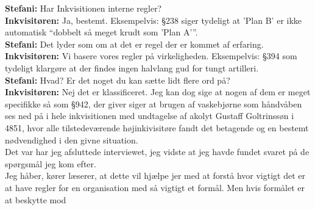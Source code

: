 \documentclass[letterpaper,12pt]{memoir}
\begin{document}
\textbf{Stefani:} Har Inkvisitionen interne regler?\\
\textbf{Inkvisitøren:} Ja, bestemt. Eksempelvis: §238 siger tydeligt at 'Plan B' er ikke automatisk “dobbelt så meget krudt som 'Plan A'”.\\

\textbf{Stefani:} Det lyder som om at det er regel der er kommet af erfaring.\\
\textbf{Inkvisitøren:} Vi basere vores regler på virkeligheden. Eksempelvis: §394 som tydeligt klargøre at der findes ingen halvlang gud for tungt artilleri.\\

\textbf{Stefani:} Hvad? Er det noget du kan sætte lidt flere ord på?\\
\textbf{Inkvisitøren:} Nej det er klassificeret. Jeg kan dog sige at nogen af dem er meget specifikke så som §942, der giver siger at brugen af vaskebjørne som håndvåben ses ned på i hele inkvisitionen med undtagelse af akolyt Gustaff Goltrinssøn i 4851, hvor alle tilstedeværende højinkivisitøre fandt det betagende og en bestemt nødvendighed i den givne situation.\\

Det var har jeg afsluttede interviewet, jeg vidste at jeg havde fundet svaret på de spørgsmål jeg kom efter. \\
Jeg håber, kører læserer, at dette vil hjælpe jer med at forstå hvor vigtigt det er at have regler for en organisation med så vigtigt et formål. Men hvis formålet er at beskytte mod 
\end{document}
